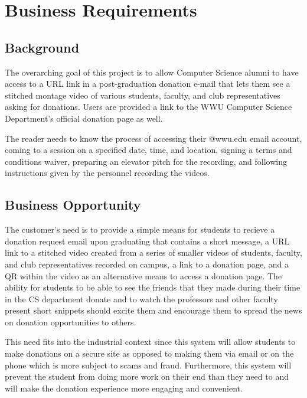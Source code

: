 \section{Business Requirements}
\subsection{Background}

The overarching goal of this project is to allow Computer Science alumni to have access to a URL link 
in a post-graduation donation e-mail that lets them see a stitched montage video of various students, faculty, and
club representatives asking for donations. Users are provided a link to the WWU Computer 
Science Department's official donation page as well.

The reader needs to know the process of accessing their @wwu.edu email account,
coming to a session on a specified date, time, and location, signing a terms and conditions waiver, 
preparing an elevator pitch for the recording, and following instructions given by the personnel recording
the videos.

\subsection{Business Opportunity}

The customer's need is to provide a simple means for students to recieve a donation request email upon graduating that
contains a short message, a URL link to a stitched video created from a series of smaller videos of students, faculty, 
and club representatives recorded on campus, a link to a donation page, and a QR within the video as an alternative means to
access a donation page. The ability for students to be able to see the friends that 
they made during their time in the CS department donate and to watch the professors and other faculty present short snippets 
should excite them and encourage them to spread the news on donation opportunities to others.

This need fits into the industrial context since this system will allow students to make donations on a secure site as opposed to
making them via email or on the phone which is more subject to scams and fraud. Furthermore, this system will prevent the student 
from doing more work on their end than they need to and will make the donation experience more engaging and convenient.


